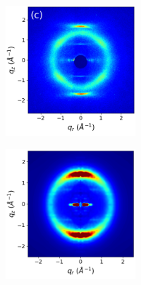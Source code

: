\documentclass[journal=jpcbfk,manuscript=article]{achemso}
\begin{document}
\begin{figure}[!htb]
\begin{subfigure}{0.88\textwidth}
\begin{subfigure}{0.28\linewidth}
\begin{subfigure}{\textwidth}
			\end{subfigure}
	\end{subfigure}
	\begin{subfigure}{0.4\linewidth}
	\centering
			\begin{subfigure}{\textwidth}
		       		\centering
	        		\includegraphics[width=\linewidth]{WAXS_raw_jet_nocbar.png}
			\end{subfigure}
	\end{subfigure}
	\begin{subfigure}{0.28\linewidth}
	\centering
			\begin{subfigure}{\textwidth}
			\centering
		        	\includegraphics[width=\linewidth]{rzplot_offset_300K_jet_nocbar.png}

\end{subfigure}
\end{subfigure}
\end{subfigure}
\end{figure}
\end{document}
